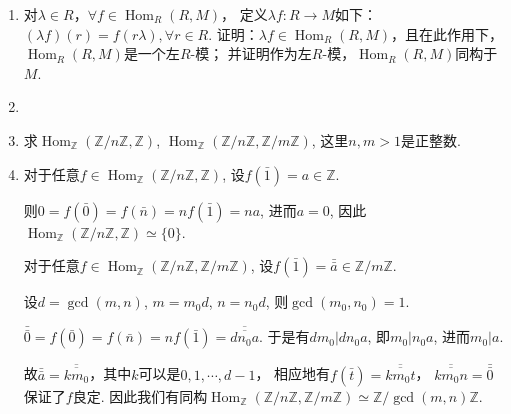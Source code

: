 \begin{enumerate}
    \item[(ii)]对$\lambda\in R$，$\forall f\in\operatorname{Hom}_R(R,M)$，
        定义$\lambda f\colon R\rightarrow M$如下：
        $(\lambda f)(r)=f(r\lambda), \forall r\in R$. 
        证明：$\lambda f\in\operatorname{Hom}_R(R,M)$，且在此作用下，
        $\operatorname{Hom}_R(R,M)$是一个左$R$-模；
        并证明作为左$R$-模，$\operatorname{Hom}_R(R,M)$同构于$M$.
    \item[\textbf{证明:}]

    \item[2.1] 求$\operatorname{Hom}_\mathbb{Z}(\mathbb{Z}/n\mathbb{Z},\mathbb{Z})$, 
        $\operatorname{Hom}_\mathbb{Z}(\mathbb{Z}/n\mathbb{Z},\mathbb{Z}/m\mathbb{Z})$, 
        这里$n,m>1$是正整数.
        
    \item[\textbf{证明:}]
        对于任意$f\in \operatorname{Hom}_\mathbb{Z}(\mathbb{Z}/n\mathbb{Z},\mathbb{Z})$, 
        设$f(\bar{1})=a\in \mathbb{Z}$.\par
        则$0=f(\bar{0})=f(\bar{n})=nf(\bar{1})=na$, 进而$a=0$, 
        因此$\operatorname{Hom}_\mathbb{Z}(\mathbb{Z}/n\mathbb{Z},\mathbb{Z})\simeq \{0\}$.\par

        对于任意$f\in \operatorname{Hom}_\mathbb{Z}(\mathbb{Z}/n\mathbb{Z},\mathbb{Z}/m\mathbb{Z})$, 
        设$f(\bar{1})=\bar{\bar{a}}\in \mathbb{Z}/m\mathbb{Z}$.\par
        设$d=\operatorname{gcd}(m,n)$, $m=m_0d$, $n=n_0d$, 
        则$\operatorname{gcd}(m_0,n_0)=1$.\par
        $\bar{\bar{0}}=f(\bar{0})=f(\bar{n})=nf(\bar{1})=\overline{\overline{dn_0a}}$. 
        于是有$dm_0 | dn_0a$, 即$m_0|n_0 a$, 进而$m_0 | a$.\par
        故$\bar{\bar{a}}=\overline{\overline{km_0}}$，其中$k$可以是$0,1,\cdots,d-1$，
        相应地有$f(\bar{t})=\overline{\overline{km_0t}}$，
        $\overline{\overline{km_0n}}=\bar{\bar{0}}$保证了$f$良定. 
        因此我们有同构$\operatorname{Hom}_\mathbb{Z}(\mathbb{Z}/n\mathbb{Z},\mathbb{Z}/m\mathbb{Z})
        \simeq \mathbb{Z}/ \operatorname{gcd}(m,n)\mathbb{Z}$.
        

\end{enumerate}
